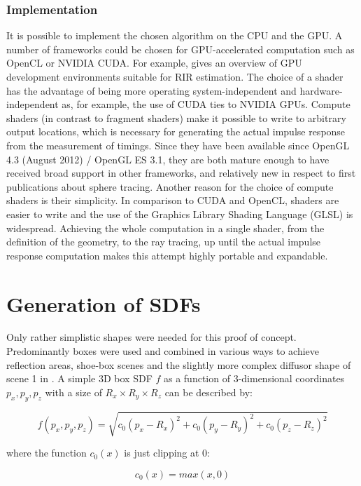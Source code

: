 \documentclass[twoside,a4paper]{article}
\begin{document}
\subsubsection{Implementation}
It is possible to implement the chosen algorithm on the CPU and the GPU. A number of frameworks could be chosen for GPU-accelerated computation such as OpenCL or NVIDIA CUDA. For example, \cite{stoltzfus_performance_2017} gives an overview of GPU development environments suitable for RIR estimation. The choice of a shader has the advantage of being more operating system-independent and hardware-independent as, for example, the use of CUDA ties to NVIDIA GPUs. Compute shaders (in contrast to fragment shaders) make it possible to write to arbitrary output locations, which is necessary for generating the actual impulse response from the measurement of timings. Since they have been available since OpenGL 4.3 (August 2012) / OpenGL ES 3.1, they are both mature enough to have received broad support in other frameworks, and relatively new in respect to first publications about sphere tracing. Another reason for the choice of compute shaders is their simplicity. In comparison to CUDA and OpenCL, shaders are easier to write and the use of the Graphics Library Shading Language (GLSL) is widespread. Achieving the whole computation in a single shader, from the definition of the geometry, to the ray tracing, up until the actual impulse response computation makes this attempt highly portable and expandable.

\section{Generation of SDFs}

Only rather simplistic shapes were needed for this proof of concept. Predominantly boxes were used and combined in various ways to achieve reflection areas, shoe-box scenes and the slightly more complex diffusor shape of scene 1 in \cite{brinkmann_round_2019}. A simple 3D box SDF $f$ as a function of 3-dimensional coordinates $p_x, p_y, p_z$ with a size of $R_x\times R_y \times R_z$ can be described by:

\begin{equation}
  f(p_x, p_y, p_z) = \sqrt{c_0(p_x - R_x)^2 + c_0(p_y - R_y)^2 + c_0(p_z - R_z)^2}
  \label{eq:eq1}
\end{equation}

where the function $c_0(x)$ is just clipping at 0:

\begin{equation}
c_0(x) = max(x,0) 
\end{equation}
\end{document}
